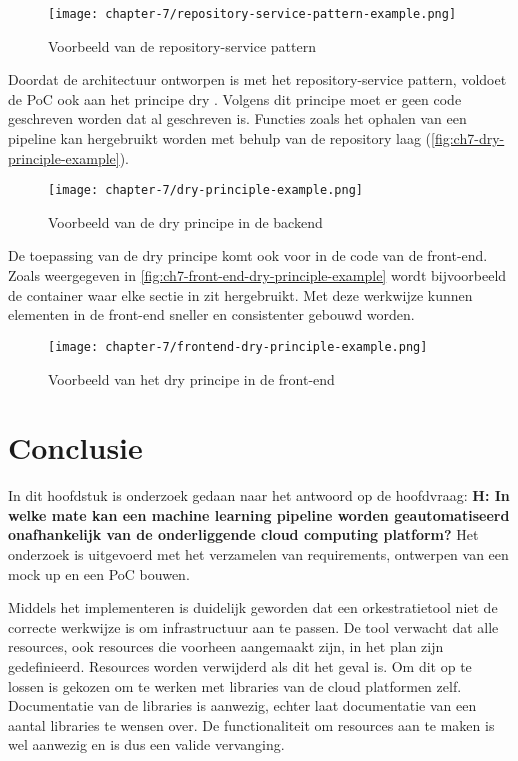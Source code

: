 \begin{figure}[hbt!]
  \centering
  \texttt{[image: chapter-7/repository-service-pattern-example.png]}
  \caption{Voorbeeld van de repository-service pattern}
  \label{fig:ch7-repository-service-pattern-example}
\end{figure}

Doordat de architectuur ontworpen is met het repository-service pattern, voldoet de PoC ook aan het principe \acrfull{dry} \cite{clean-code-martin}. Volgens dit principe moet er geen code geschreven worden dat al geschreven is. Functies zoals het ophalen van een pipeline kan hergebruikt worden met behulp van de repository laag (\autoref{fig:ch7-dry-principle-example}).

\begin{figure}[hbt!]
  \centering
  \texttt{[image: chapter-7/dry-principle-example.png]}
  \caption{Voorbeeld van de \acrfull{dry} principe in de backend}
  \label{fig:ch7-dry-principle-example}
\end{figure}

De toepassing van de \acrshort{dry} principe komt ook voor in de code van de front-end. Zoals weergegeven in \autoref{fig:ch7-front-end-dry-principle-example} wordt bijvoorbeeld de container waar elke sectie in zit hergebruikt. Met deze werkwijze kunnen elementen in de front-end sneller en consistenter gebouwd worden.

\begin{figure}[hbt!]
  \centering
  \texttt{[image: chapter-7/frontend-dry-principle-example.png]}
  \caption{Voorbeeld van het \acrfull{dry} principe in de front-end}
  \label{fig:ch7-front-end-dry-principle-example}
\end{figure}


\section{Conclusie}\label{sec:ch7-conclusie}
In dit hoofdstuk is onderzoek gedaan naar het antwoord op de hoofdvraag: \textbf{H: In welke mate kan een machine learning pipeline worden geautomatiseerd onafhankelijk van de onderliggende cloud computing platform?} Het onderzoek is uitgevoerd met het verzamelen van requirements, ontwerpen van een mock up en een PoC bouwen.

Middels het implementeren is duidelijk geworden dat een orkestratietool niet de correcte werkwijze is om infrastructuur aan te passen. De tool verwacht dat alle resources, ook resources die voorheen aangemaakt zijn, in het plan zijn gedefinieerd. Resources worden verwijderd als dit het geval is. Om dit op te lossen is gekozen om te werken met libraries van de cloud platformen zelf. Documentatie van de libraries is aanwezig, echter laat documentatie van een aantal libraries te wensen over. De functionaliteit om resources aan te maken is wel aanwezig en is dus een valide vervanging.

